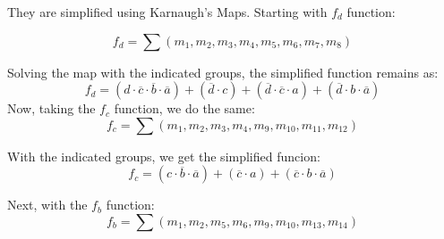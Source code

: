         They are simplified using Karnaugh's Maps. Starting with $f_d$ function:\par
        \[
            f_{d}=\sum{(m_1,m_2,m_3,m_4,m_5,m_6,m_7,m_8)}
        \]
        \begin{centering}
            \begin{Karnaugh}
            \end{Karnaugh}
        \par\end{centering}
        Solving the map with the indicated groups, the simplified 
        function remains as:
        \[
            \boxed{f_{d}=(d \cdot \overline{c} \cdot \overline{b} \cdot \overline{a})+
            (\overline{d} \cdot c)+(\overline{d} \cdot \overline{c} \cdot a)+
            (\overline{d} \cdot b \cdot \overline{a})}    
        \]
        \newpage
        Now, taking the $f_c$ function, we do the same:
        \[
            f_{c}=\sum{(m_1,m_2,m_3,m_4,m_9,m_{10},m_{11},m_{12})}
        \]
        \begin{centering}
            \begin{Karnaugh}
            \end{Karnaugh}
        \par\end{centering}
        With the indicated groups, we get the simplified funcion:
        \[
            \boxed{f_c=(c \cdot \overline{b} \cdot \overline{a})+
            (\overline{c} \cdot a)+
            (\overline{c} \cdot b \cdot \overline{a})}    
        \]\par
        Next, with the $f_b$ function:
        \[
            f_{b}=\sum{(m_1,m_2,m_5,m_6,m_9,m_{10},m_{13},m_{14})}    
        \]
        \begin{centering}
            \begin{Karnaugh}
            \end{Karnaugh}
        \par\end{centering}

